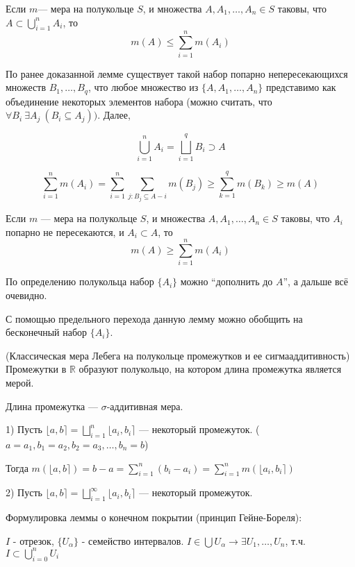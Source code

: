 \leftbar

 Если $m$— мера на полукольце $S$, и множества $A, A_1, \dots , A_n \in S$ таковы, что $A \subset
\bigcup_{i=1}^n A_i$, то 
$$m(A) \leq \sum^n_{i=1} m(A_i)$$

\Proof По ранее доказанной лемме существует такой набор попарно непересекающихся множеств $B_1, \dots, B_q$, что любое множество из $\{A, A_1, \dots , A_n\}$ представимо как объединение некоторых элементов набора (можно считать, что $\forall B_i\ \exists A_j\ (B_i \subseteq A_j ))$. Далее,

$$\bigcup^n_{i=1} A_i = \bigsqcup_{i=1}^q B_i \supset A$$

$$\sum^n_{i=1} m(A_i) = \sum^n_{i=1} \sum_{j:B_j \subseteq A-i} m(B_j) \geq \sum^q_{k=1} m(B_k) \geq m(A)$$ \EndProof

 Если $m$ — мера на полукольце $S$, и множества $A, A_1, \dots , A_n \in S$ таковы, что $A_i$ попарно не пересекаются, и $A_i \subset A$, то 
$$m(A) \geq \sum^n_{i=1} m(A_i)$$

\Proof По определению полукольца набор $\{A_i\}$ можно “дополнить до $A$”, а дальше всё очевидно. \EndProof

\Conseq С помощью предельного перехода данную лемму можно обобщить на бесконечный набор $\{A_i\}$.
\endleftbar

\Example 

(Классическая мера Лебега на полукольце промежутков и ее сигмааддитивность) Промежутки в $\mathbb{R}$ образуют полукольцо, на котором длина промежутка является мерой.

\Th Длина промежутка — $\sigma$-аддитивная мера.

\Proof 

1) Пусть $\lfloor a, b \rceil = \bigsqcup^{n}_{i=1} \lfloor a_i, b_i \rceil$ — некоторый промежуток. ($a = a_1, b_1 = a_2, b_2 = a_3, \dots, b_n = b$)

Тогда $m(\lfloor a, b \rceil) = b - a = \sum^n_{i=1}(b_i - a_i) = \sum^n_{i=1} m(\lfloor a_i, b_i \rceil)$

2) Пусть $\lfloor a, b\rceil = \bigsqcup^{\infty}_{i=1} \lfloor a_i, b_i \rceil$ — некоторый промежуток.

Формулировка леммы о конечном покрытии (принцип Гейне-Бореля): 

$I$ - отрезок, $\{U_{\alpha}\}$ - семейство интервалов. $I \in \bigcup U_{\alpha} \rightarrow \exists U_1, \dots, U_n$, т.ч. $I \subset \bigcup_{i=0}^n U_i$

